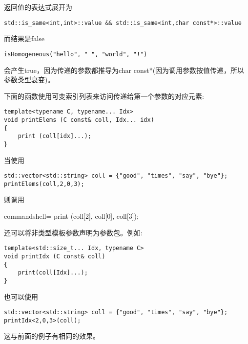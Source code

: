 返回值的表达式展开为

\begin{lstlisting}[style=styleCXX]
std::is_same<int,int>::value && std::is_same<int,char const*>::value
\end{lstlisting}

而结果是false

\begin{lstlisting}[style=styleCXX]
isHomogeneous("hello", " ", "world", "!")
\end{lstlisting}

会产生true，因为传递的参数都推导为char const*(因为调用参数按值传递，所以参数类型衰变)。


下面的函数使用可变索引列表来访问传递给第一个参数的对应元素:

\begin{lstlisting}[style=styleCXX]
template<typename C, typename... Idx>
void printElems (C const& coll, Idx... idx)
{
	print (coll[idx]...);
}
\end{lstlisting}

当使用

\begin{lstlisting}[style=styleCXX]
std::vector<std::string> coll = {"good", "times", "say", "bye"};
printElems(coll,2,0,3);
\end{lstlisting}

则调用

\begin{tcblisting}{commandshell={}}
print (coll[2], coll[0], coll[3]);
\end{tcblisting}

还可以将非类型模板参数声明为参数包。例如:

\begin{lstlisting}[style=styleCXX]
template<std::size_t... Idx, typename C>
void printIdx (C const& coll)
{
	print(coll[Idx]...);
}
\end{lstlisting}

也可以使用

\begin{lstlisting}[style=styleCXX]
std::vector<std::string> coll = {"good", "times", "say", "bye"};
printIdx<2,0,3>(coll);
\end{lstlisting}

这与前面的例子有相同的效果。


